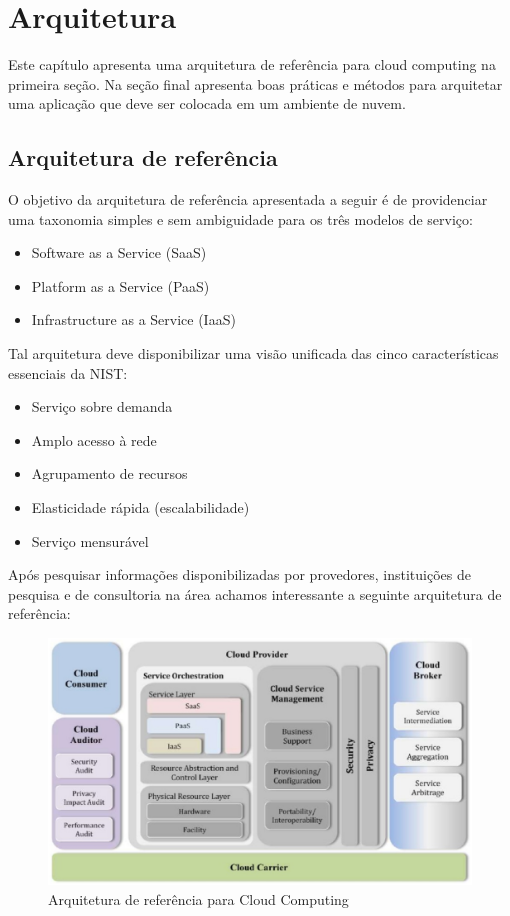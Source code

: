 \chapter{Arquitetura}

Este capítulo apresenta uma arquitetura de referência para cloud computing na primeira seção. Na seção final apresenta boas práticas e métodos para arquitetar uma aplicação que deve ser colocada em um ambiente de nuvem.

\section{Arquitetura de referência}

O objetivo da arquitetura de referência apresentada a seguir é de providenciar uma taxonomia simples e sem ambiguidade para os três modelos de serviço:

\begin{itemize}
  \item
    Software as a Service (SaaS)
  \item
    Platform as a Service (PaaS)
  \item
    Infrastructure as a Service (IaaS)
\end{itemize}

Tal arquitetura deve disponibilizar uma visão unificada das cinco características essenciais da NIST:

\begin{itemize}
  \item Serviço sobre demanda
  \item Amplo acesso à rede
  \item Agrupamento de recursos
  \item Elasticidade rápida (escalabilidade)
  \item Serviço mensurável
\end{itemize}

Após pesquisar informações disponibilizadas por provedores, instituições de pesquisa e de consultoria na área achamos interessante a seguinte arquitetura de referência:

\begin{figure}[h!]
  \centering
  \includegraphics[scale=0.5]{imagens/cloudarch.eps}
  \caption{Arquitetura de referência para Cloud Computing}
\end{figure}

